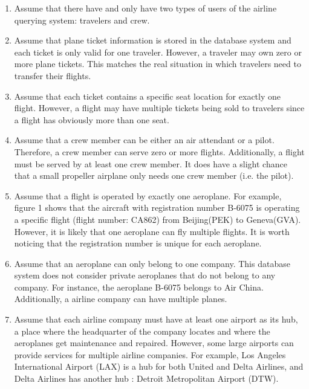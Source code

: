 \documentclass{article}
\begin{document}
	\begin{enumerate}
		\item Assume that there have and only have two types of users of the airline querying system: travelers and crew.
		
		\item Assume that plane ticket information is stored in the database system and each ticket is only valid for one traveler. However, a traveler may own zero or more plane tickets. This matches the real situation in which travelers need to transfer their flights. 
		
		\item Assume that each ticket contains a specific seat location for exactly one flight. However, a flight may have multiple tickets being sold to travelers since a flight has obviously more than one seat.   
		
		\item Assume that a crew member can be either an air attendant or a pilot. Therefore, a crew member can serve zero or more flights. Additionally, a flight must be served by at least one crew member. It does have a slight chance that a small propeller airplane only needs one crew member (i.e. the pilot).
		
		\item Assume that a flight is operated by exactly one aeroplane. For example, figure 1 shows that the aircraft with registration number B-6075 is operating a specific flight (flight number: CA862) from Beijing(PEK) to Geneva(GVA). However, it is likely that one aeroplane can fly multiple flights. It is worth noticing that the  registration number is unique for each aeroplane.
		
		\item Assume that an aeroplane can only belong to one company. This database system does not consider private aeroplanes that do not belong to any company. For instance, the aeroplane B-6075 belongs to Air China. Additionally, a airline company can have multiple planes. 
		
		\item Assume that each airline company must have at least one airport as its hub, a place where the headquarter of the company locates and where the aeroplanes get maintenance and repaired. However, some large airports can provide services for multiple airline companies. For example, Los Angeles International Airport (LAX) is a hub for both United and Delta Airlines, and Delta Airlines has another hub : Detroit Metropolitan Airport (DTW).
		

\end{enumerate}
\end{document}
